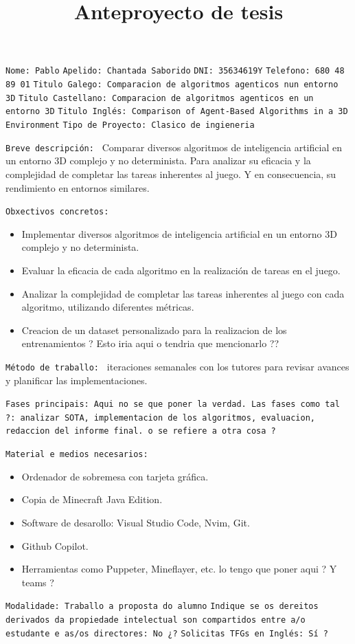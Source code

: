 
\title{Anteproyecto de tesis}
\texttt{Nome: Pablo}
\texttt{Apelido: Chantada Saborido}
\texttt{DNI: 35634619Y}
\texttt{Telefono: 680 48 89 01}
\texttt{Titulo Galego: Comparacion de algoritmos agenticos nun entorno 3D}
\texttt{Titulo Castellano: Comparacion de algoritmos agenticos en un entorno 3D}
\texttt{Titulo Inglés: Comparison of Agent-Based Algorithms in a 3D Environment}
\texttt{Tipo de Proyecto: Clasico de ingieneria}

\texttt{Breve descripción: } Comparar diversos algoritmos de inteligencia artificial en un entorno 3D complejo y no determinista. 
Para analizar su eficacia y la complejidad de completar las tareas inherentes al juego. Y en consecuencia, su rendimiento en entornos similares. 

\texttt{Obxectivos concretos: }
\begin{itemize}
    \item Implementar diversos algoritmos de inteligencia artificial en un entorno 3D complejo y no determinista.
    \item Evaluar la eficacia de cada algoritmo en la realización de tareas en el juego.
    \item Analizar la complejidad de completar las tareas inherentes al juego con cada algoritmo, utilizando diferentes métricas.
    \item Creacion de un dataset personalizado para la realizacion de los entrenamientos ? Esto iria aqui o tendria que mencionarlo ?? 
\end{itemize}

\texttt{Método de traballo: } iteraciones semanales con los tutores para revisar avances y planificar las implementaciones. 

\texttt{Fases principais: Aqui no se que poner la verdad. Las fases como tal ?: analizar SOTA, implementacion de los algoritmos, evaluacion, redaccion del informe final. 
o se refiere a otra cosa ?}

\texttt{Material e medios necesarios:}
\begin{itemize}
    \item Ordenador de sobremesa con tarjeta gráfica.
    \item Copia de Minecraft Java Edition.
    \item Software de desarollo: Visual Studio Code, Nvim, Git.
    \item Github Copilot.
    \item Herramientas como Puppeter, Mineflayer, etc. lo tengo que poner aqui ? Y teams ?
\end{itemize}

\texttt{Modalidade: Traballo a proposta do alumno}
\texttt{Indique se os dereitos derivados da propiedade intelectual son compartidos entre a/o estudante e as/os directores: No ¿?}
\texttt{Solicitas TFGs en Inglés: Sí ?}

